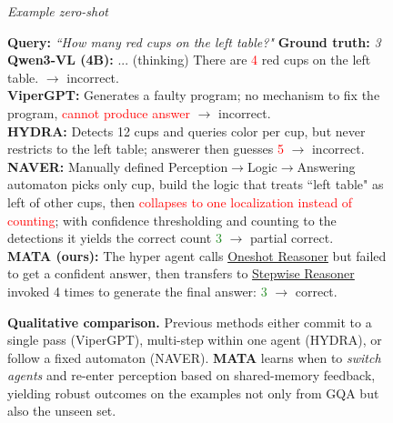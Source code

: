 \documentclass{article} %
\newcommand{\revise}[1]{{#1}}
\newcommand{\methodname}{MATA}
\begin{document}
\begin{figure}[h]
\begin{tcolorbox}[colback=gray!3, colframe=black!10, boxrule=0.4pt, left=6pt, right=6pt, top=6pt, bottom=6pt]
\begin{minipage}{0.27\linewidth}
{\scriptsize \textit{Example zero-shot}}
\end{minipage}
\hfill
\begin{minipage}{0.70\linewidth}
\scriptsize
\textbf{Query:} \emph{``How many red cups on the left table?"} \textbf{Ground truth:} \emph{3}\\[2pt]
\textbf{Qwen3-VL (4B):} ... (thinking) There are \textcolor{red}{4} red cups on the left table. $\rightarrow$  incorrect.\\
\textbf{ViperGPT:} Generates a faulty program; no mechanism to fix the program, \textcolor{red}{cannot produce answer} $\rightarrow$  incorrect.\\
\textbf{HYDRA:} Detects 12 cups and queries color per cup, but never restricts to the left table; answerer then guesses \textcolor{red}{5}  $\rightarrow$  incorrect.\\
\textbf{NAVER:} Manually defined Perception$\rightarrow$Logic$\rightarrow$Answering automaton picks only cup, build the logic that treats ``left table" as left of other cups, then \textcolor{red}{collapses to one localization instead of counting}; with confidence thresholding and counting to the detections it yields the correct count \textcolor{ForestGreen}{3} $\rightarrow$  partial correct. \\
\textbf{\methodname{} (ours):} The hyper agent calls \underline{Oneshot Reasoner} but failed to get a confident answer, then transfers to \underline{Stepwise Reasoner} invoked 4 times to generate the final answer: \textcolor{ForestGreen}{3} $\rightarrow$  correct.
\end{minipage}
\end{tcolorbox}
\caption{\revise{\textbf{Qualitative comparison.} Previous methods either commit to a single pass (ViperGPT), multi-step within one agent (HYDRA), or follow a fixed automaton (NAVER). \textbf{MATA} learns when to \emph{switch agents} and re-enter perception based on shared-memory feedback, yielding robust outcomes on the examples not only from GQA but also the unseen set.}}
\label{fig:qual_comparison}
\end{figure}
\end{document}
